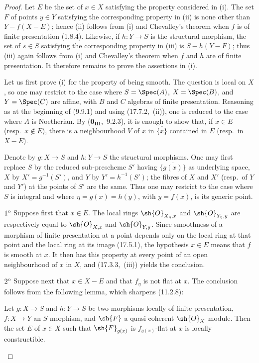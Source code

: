 
\begin{proof}
Let $E$ be the set of $x\in X$ satisfying the property considered in (i).
The set $F$ of points $y\in Y$ satisfying the corresponding property in (ii) is none other than $Y-f(X-E)$; hence (ii) follows from (i) and Chevalley's theorem when $f$ is of finite presentation (1.8.4).
Likewise, if $h:Y\to S$ is the structural morphism, the set of $s\in S$ satisfying the corresponding property in (iii) is $S-h(Y-F)$; thus (iii) again follows from (i) and Chevalley's theorem when $f$ and $h$ are of finite presentation.
It therefore remains to prove the assertions in (i).

Let us first prove (i) for the property of being smooth.
The question is local on $X$, so one may restrict to the case where $S=\Spec(A)$, $X=\Spec(B)$, and $Y=\Spec(C)$ are affine, with $B$ and $C$ algebras of finite presentation.
Reasoning as at the beginning of (9.9.1) and using (17.7.2,~(ii)), one is reduced to the case where $A$ is Noetherian.
By ($\mathbf{0}_\mathbf{III}$,~9.2.3), it is enough to show that, if $x\in E$ (resp.\ $x\notin E$), there is a neighbourhood $V$ of $x$ in $\overline{\{x\}}$ contained in $E$ (resp.\ in $X-E$).

Denote by $g:X\to S$ and $h:Y\to S$ the structural morphisms.
One may first replace $S$ by the reduced sub-prescheme $S'$ having $\overline{\{g(x)\}}$ as underlying space, $X$ by $X'=g^{-1}(S')$, and $Y$ by $Y'=h^{-1}(S')$; the fibres of $X$ and $X'$ (resp.\ of $Y$ and $Y'$) at the points of $S'$ are the same.
Thus one may restrict to the case where $S$ is integral and where $\eta=g(x)=h(y)$, with $y=f(x)$, is its generic point.

$1\textsuperscript{o}$ Suppose first that $x\in E$.
The local rings $\sh{O}_{X_\eta,x}$ and $\sh{O}_{Y_\eta,y}$ are respectively equal to $\sh{O}_{X,x}$ and $\sh{O}_{Y,y}$.
Since smoothness of a morphism of finite presentation at a point depends only on the local ring at that point and the local ring at its image (17.5.1), the hypothesis $x\in E$ means that $f$ is smooth at $x$.
It then has this property at every point of an open neighbourhood of $x$ in $X$, and (17.3.3,~(iii)) yields the conclusion.

$2\textsuperscript{o}$ Suppose next that $x\in X-E$ and that $f_\eta$ is not flat at $x$.
The conclusion follows from the following lemma, which sharpens (11.2.8):

\begin{lemma}[17.7.11.1]
\label{IV.17.7.11.1}
Let $g:X\to S$ and $h:Y\to S$ be two morphisms locally of finite presentation, $f:X\to Y$ an $S$-morphism, and $\sh{F}$ a quasi-coherent $\sh{O}_X$-module.
Then the set $E$ of $x\in X$ such that $\sh{F}_{g(x)}$ is $f_{g(x)}$-flat at $x$ is locally constructible.
\end{lemma}


\end{proof}
